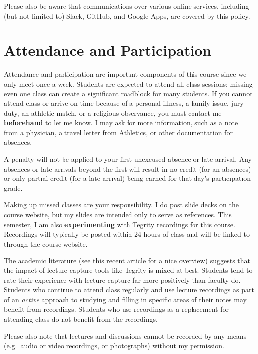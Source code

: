 \documentclass[]{book}
\theoremstyle{definition}
\theoremstyle{definition}
\theoremstyle{definition}
\theoremstyle{remark}
\begin{document}
Please also be aware that communications over various online services,
including (but not limited to) Slack, GitHub, and Google Apps, are
covered by this policy.

\hypertarget{attendance-and-participation}{%
\section{Attendance and
Participation}\label{attendance-and-participation}}

Attendance and participation are important components of this course
since we only meet once a week. Students are expected to attend all
class sessions; missing even one class can create a significant
roadblock for many students. If you cannot attend class or arrive on
time because of a personal illness, a family issue, jury duty, an
athletic match, or a religious observance, you must contact me
\textbf{beforehand} to let me know. I may ask for more information, such
as a note from a physician, a travel letter from Athletics, or other
documentation for absences.

A penalty will not be applied to your first unexcused absence or late
arrival. Any absences or late arrivals beyond the first will result in
no credit (for an absences) or only partial credit (for a late arrival)
being earned for that day's participation grade.

Making up missed classes are your responsibility. I do post slide decks
on the course website, but my slides are intended only to serve as
references. This semester, I am also \textbf{experimenting} with Tegrity
recordings for this course. Recordings will typically be posted within
24-hours of class and will be linked to through the course website.

The academic literature (see
\href{https://link.springer.com/article/10.1007/s10734-018-0275-9}{this
recent article} for a nice overview) suggests that the impact of lecture
capture tools like Tegrity is mixed at best. Students tend to rate their
experience with lecture capture far more positively than faculty do.
Students who continue to attend class regularly and use lecture
recordings as part of an \emph{active} approach to studying and filling
in specific areas of their notes may benefit from recordings. Students
who use recordings as a replacement for attending class do not benefit
from the recordings.

Please also note that lectures and discussions cannot be recorded by any
means (e.g.~audio or video recordings, or photographs) without my
permission.
\end{document}
